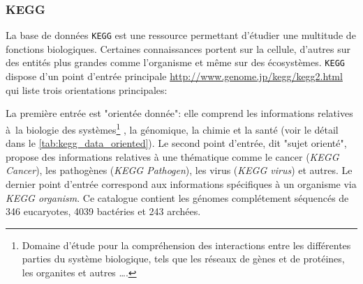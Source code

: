 \begin{refsegment}
    \subsubsection{KEGG}
    
    La base de données \texttt{\gls{KEGG}} \cite{ogata1999kegg,kanehisa2000kegg,kanehisa2002kegg,kanehisa2004kegg,aoki2005using,kanehisa2010kegg,kanehisa2017kegg} est une ressource permettant d'étudier une multitude de fonctions biologiques. Certaines connaissances portent sur la cellule, d'autres sur des entités plus grandes comme l'organisme et même sur  des écosystèmes. \texttt{\gls{KEGG}} dispose d'un point d'entrée principale \url{http://www.genome.jp/kegg/kegg2.html} qui liste trois orientations principales:
    
    La première entrée est "orientée donnée": elle comprend les informations relatives à  la biologie des systèmes\footnote{Domaine d'étude pour la compréhension des interactions entre les différentes parties du système biologique, tels que les réseaux de gènes et de protéines, les organites et autres \ldots. } , la génomique, la chimie et la santé (voir le détail dans le \cref{tab:kegg_data_oriented}). Le second point d'entrée, dit "sujet orienté", propose des informations relatives à une thématique comme le cancer (\textit{KEGG Cancer}), les pathogènes (\textit{KEGG Pathogen}), les virus (\textit{KEGG virus}) et autres. Le dernier point d'entrée correspond aux informations spécifiques à un organisme via \textit{KEGG organism}. Ce catalogue contient les génomes complétement séquencés de 346 eucaryotes, 4039 bactéries et 243 archées.  
    

\end{refsegment}
